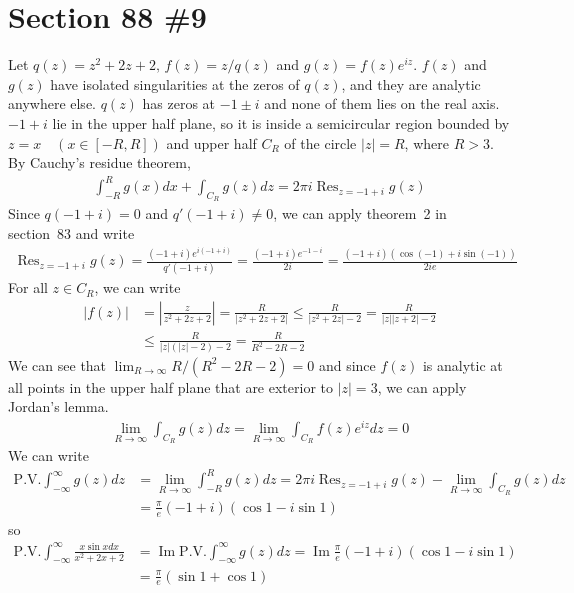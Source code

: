 \documentclass{scrartcl}
\newcommand{\imag}{\operatorname{Im}}
\DeclareMathOperator*{\Res}{Res}
\begin{document}
\section{Section 88 \#9}
Let \(q(z) = z^2 + 2z + 2,\, f(z) = z / q(z)\) and \(g(z) = f(z) e^{iz}\).
\(f(z)\) and \(g(z)\) have isolated singularities at the zeros of \(q(z)\), and they are analytic anywhere else.
\(q(z)\) has zeros at \(-1 \pm i\) and none of them lies on the real axis.
\(-1 + i\) lie in the upper half plane, so it is inside a semicircular region bounded by \(z = x \quad (x \in [-R, R])\) and upper half \(C_R\) of the circle \(|z| = R\), where \(R > 3\).
By Cauchy's residue theorem,
\begin{align*}
  \int^R_{-R} g(x) dx + \int_{C_R} g(z) dz
  = 2\pi i \Res_{z = -1 + i} g(z)
\end{align*}
Since \(q(-1 + i) = 0\) and \(q'(-1 + i) \not = 0\), we can apply theorem~2 in section~83 and write
\begin{align*}
  \Res_{z = -1 + i} g(z)
  = \frac{(-1 + i) e^{i(-1 + i)}}{q'(-1 + i)}
  = \frac{(-1 + i) e^{-1 - i}}{2i}
  = \frac{(-1 + i) (\cos (-1) + i \sin (-1))}{2ie}
\end{align*}
For all \(z \in C_R\), we can write
\begin{align*}
  |f(z)|
  &= \left| \frac{z}{z^2 + 2z + 2} \right|
  = \frac{R}{|z^2 + 2z + 2|}
  \leq \frac{R}{|z^2 + 2z| - 2}
  = \frac{R}{|z||z + 2| - 2} \\
  &\leq \frac{R}{|z|(|z| - 2) - 2}
  = \frac{R}{R^2 - 2R - 2}
\end{align*}
We can see that \(\lim_{R \to \infty} R / (R^2 - 2R - 2) = 0\) and since \(f(z)\) is analytic at all points in the upper half plane that are exterior to \(|z| = 3\), we can apply Jordan's lemma.
\begin{align*}
  \lim_{R \to \infty} \int_{C_R} g(z) dz = \lim_{R \to \infty} \int_{C_R} f(z) e^{iz} dz = 0
\end{align*}
We can write
\begin{align*}
  \text{P.V.} \int^\infty_{-\infty} g(z) dz
  &= \lim_{R \to \infty} \int^R_{-R} g(z) dz
  = 2\pi i \Res_{z = -1 + i} g(z) - \lim_{R \to \infty} \int_{C_R} g(z) dz \\
  &= \frac{\pi}{e} (-1 + i) (\cos 1 - i \sin 1)
\end{align*}
so
\begin{align*}
  \text{P.V.} \int^\infty_{-\infty} \frac{x \sin x dx}{x^2 + 2x + 2}
  &= \imag \text{P.V.} \int^\infty_{-\infty} g(z) dz
  = \imag \frac{\pi}{e} (-1 + i) (\cos 1 - i \sin 1) \\
  &= \frac{\pi}{e} (\sin 1 + \cos 1)
\end{align*}
\end{document}
